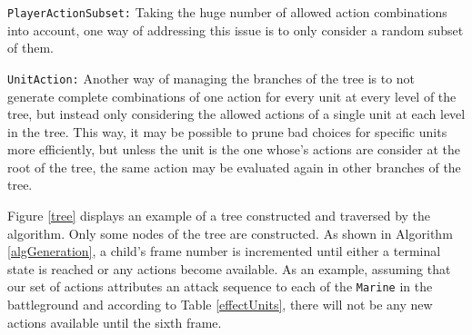 \begin{shortitem}
\item \texttt{PlayerActionSubset:}
	Taking the huge number of allowed action combinations into account, one way of addressing this issue is to only consider a random subset of them.
\item \texttt{UnitAction:}
	Another way of managing the branches of the tree is to not generate complete combinations of one action for every unit at every level of the tree, but instead only considering the allowed actions of a single unit at each level in the tree.
	This way, it may be possible to prune bad choices for specific units more efficiently, but unless the unit is the one whose's actions are consider at the root of the tree, the same action may be evaluated again in other branches of the tree.
\end{shortitem}
\label{actiongeneration}

Figure \ref{tree} displays an example of a tree constructed and traversed by the algorithm. Only some nodes of the tree are constructed.
As shown in Algorithm \ref{algGeneration}, a child's frame number is incremented until either a terminal state is reached or any actions become available.
As an example, assuming that our set of actions attributes an attack sequence to each of the \texttt{Marine} in the battleground and according to Table \ref{effectUnits}, there will not be any new actions available until the sixth frame.

